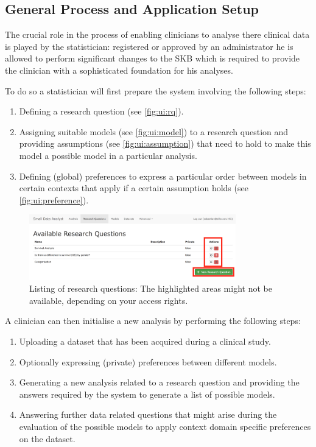 \subsection{General Process and Application Setup}
\label{sub:process}
The crucial role in the process of enabling clinicians to analyse there clinical data is played by the statistician: registered or approved by an administrator he is allowed to perform significant changes to the \gls{SKB} which is required to provide the clinician with a sophisticated foundation for his analyses. 

To do so a statistician will first prepare the system involving the following steps:


\begin{enumerate}
	\item Defining a research question (see \autoref{fig:ui:rq}).
	\item Assigning suitable models (see \autoref{fig:ui:model}) to a research question and providing assumptions (see \autoref{fig:ui:assumption}) that need to hold to make this model a possible model in a particular analysis.
	\item Defining (global) preferences to express a particular order between models in certain contexts that apply if a certain assumption holds (see \autoref{fig:ui:preference}).
\end{enumerate}

\begin{figure}[h]
\centering
\includegraphics[width=0.8\textwidth]{figures/ui_RQ}
\caption{Listing of research questions: The highlighted areas might not be available, depending on your access rights.}
\label{fig:ui:rq}
\end{figure}


A clinician can then initialise a new analysis by performing the following steps:
 
\begin{enumerate}
	\item Uploading a dataset that has been acquired during a clinical study.
	\item Optionally expressing (private) preferences between different models.
	\item Generating a new analysis related to a research question and providing the answers required by the system to generate a list of possible models.
	\item Answering further data related questions that might arise during the evaluation of the possible models to apply context domain specific preferences on the dataset.
\end{enumerate}

